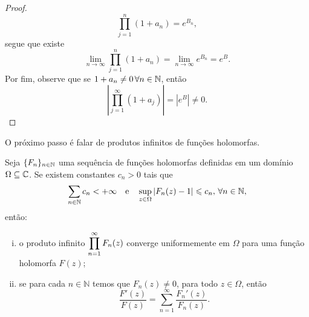 \begin{proof}
       \begin{equation*}
           \prod_{j=1}^n (1+a_n) = e^{B_n},
       \end{equation*}
       segue que existe
       \begin{equation*}
           \lim_{n\to\infty} \prod_{j=1}^n (1+a_n) = \lim_{n\to\infty} e^{B_n} = e^B.
       \end{equation*}
       Por fim, observe que se $1+a_n \neq 0 \, \forall n\in \mathbb{N}$, então
       \begin{equation*}
           \left| \prod_{j=1}^{\infty} (1+a_j) \right| = |e^B| \neq 0.
       \end{equation*}
    \end{proof}
    
    O próximo passo é falar de produtos infinitos de funções holomorfas.
    \begin{proposicao}
    \label{prop:prod-inf-func-holom}
        Seja $\{ F_n \}_{n\in\mathbb{N}}$ uma sequência de funções holomorfas
        definidas em um domínio $\Omega\subseteq\mathbb{C}$. Se existem constantes
        $c_n>0$ tais que 
        \[ 
        \sum_{n\in\mathbb{N}} c_n < +\infty 
        \quad\text{e}\quad 
        \sup_{z\in\Omega} |F_n(z) - 1| \leqslant c_n, \, \forall n\in\mathbb{N},
        \]
        então:
        \begin{enumerate}[(i)]
            \item o produto infinito $\displaystyle{ \prod_{n=1}^{\infty} F_n(z) }$ converge
            uniformemente em $\Omega$ para uma função holomorfa $F(z)$;
            \item se para cada $n\in\mathbb{N}$ temos que $F_n(z) \neq 0$, para todo  
            $z\in\Omega$, então 
            \[
            \frac{F'(z)}{F(z)} = \sum_{n=1}^{\infty} \frac{F_n'(z)}{F_n(z)}.
            \]
        \end{enumerate}
    \end{proposicao}
